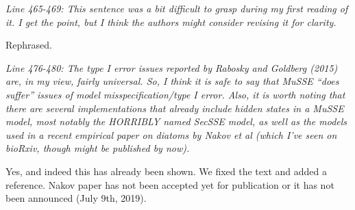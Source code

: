 \documentclass[11pt]{article}
\renewenvironment{quote}{\bigskip\noindent\itshape\ignorespaces}{\smallskip}
\begin{document}
\begin{quote}
Line 465-469: This sentence was a bit difficult to grasp during my first reading of it.
I get the point, but I think the authors might consider revising it for clarity.
\end{quote}

Rephrased. %

\begin{quote}
Line 476-480: The type I error issues reported by Rabosky and Goldberg (2015) are, in my view, fairly universal.
So, I think it is safe to say that MuSSE ``does suffer'' issues of model misspecification/type I error.
Also, it is worth noting that there are several implementations that already include hidden states in a MuSSE model, most notably the HORRIBLY named SecSSE model, as well as the models used in a recent empirical paper on diatoms by Nakov et al (which I've seen on bioRxiv, though might be published by now).
\end{quote}

Yes, and indeed this has already been shown.
We fixed the text and added a reference. Nakov paper has not been accepted yet for publication or it has not been announced (July 9th, 2019).



\end{document}

